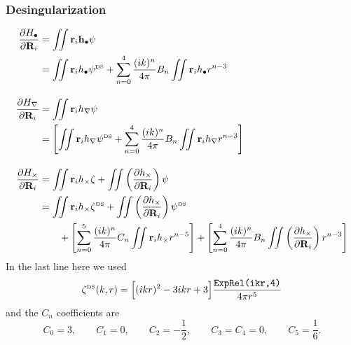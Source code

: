 \documentclass[letterpaper]{article}
\begin{document}
\subsubsection*{Desingularization}

\begin{align*}
  \frac{\partial H_\bullet}{\partial \mathbf{R}_i}
&= \iint \mathbf{r}_i \mathbf{h}_\bullet \psi
\\
&= \iint \mathbf{r}_i h_{\bullet} \psi^{\hbox{\tiny{DS}}}
   +\sum_{n=0}^4 \frac{(ik)^n}{4\pi} B_n 
    \iint \mathbf{r}_i h_{\bullet} r^{n-3}
\\[10pt]
  \frac{\partial H_\nabla}{\partial \mathbf{R}_i}
&= \iint \mathbf{r}_i h_\nabla \psi  
\\
&= \left[ \iint \mathbf{r}_i h_{\nabla} \psi^{\hbox{\tiny{DS}}}
                 +\sum_{n=0}^4 \frac{(ik)^n}{4\pi} B_n 
                  \iint \mathbf{r}_i h_{\nabla } r^{n-3}
           \right]
\\[10pt]
  \frac{\partial H_\times}{\partial \mathbf{R}_i}
&=   \iint \mathbf{r}_i h_\times \zeta
   + \iint \left( \frac{\partial h_\times}{\partial \mathbf{R}_i}\right) \psi
\\
&= \iint \mathbf{r}_i h_{\times} \zeta^{\hbox{\tiny{DS}}}
    +\iint \left(\frac{\partial h_\times}{\partial \mathbf{R}_i}\right)\psi^{\hbox{\tiny{DS}}}   
\\ 
&\qquad
   +\left[ \sum_{n=0}^5 \frac{(ik)^n}{4\pi} C_n 
                   \iint \mathbf{r}_i h_{\times } r^{n-5}
            \right]
   + \left[ \sum_{n=0}^4 \frac{(ik)^n}{4\pi} B_n 
            \iint \left( \frac{\partial h_{\times}}{\partial \mathbf{R}_i}\right) r^{n-3}
     \right]
\end{align*}
In the last line here we used
$$ \zeta^{\hbox{\tiny{DS}}}(k, r) = 
   \Big[ (ikr)^2 -3ikr + 3\Big]\frac{\texttt{ExpRel(ikr,4)}}{4\pi r^5} 
$$
and the $C_n$ coefficients are 
$$ C_0=3, \qquad C_1=0, \qquad C_2=-\frac{1}{2}, 
   \qquad C_3=C_4=0, \qquad C_5=\frac{1}{6}.
$$

\newpage
\end{document}
